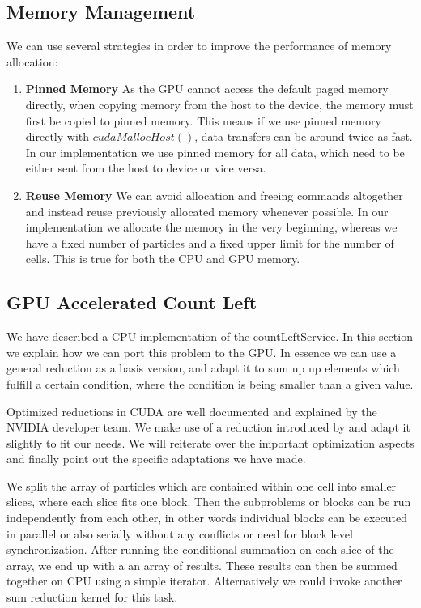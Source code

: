 \documentclass[]{article}
\begin{document}
\subsection{Memory Management}

We can use several strategies in order to improve the performance of memory allocation: 

\begin{enumerate}
	\item \textbf{Pinned Memory} As the GPU cannot access the default paged memory directly, when copying memory from the host to the device, the memory must first be copied to pinned memory. This means if we use pinned memory directly with $cudaMallocHost()$, data transfers can be around twice as fast. In our implementation we use pinned memory for all data, which need to be either sent from the host to device or vice versa.
	\item \textbf{Reuse Memory} We can avoid allocation and freeing commands altogether and instead reuse previously allocated memory whenever possible. In our implementation we allocate the memory in the very beginning, whereas we have a fixed number of particles and a fixed upper limit for the number of cells. This is true for both the CPU and GPU memory.
\end{enumerate}

\subsection{GPU Accelerated Count Left}


We have described a CPU implementation of the countLeftService. In this section we explain how we can port this problem to the GPU. In essence we can use a general reduction as a basis version, and adapt it to sum up up elements which fulfill a certain condition, where the condition is being smaller than a given value.

Optimized reductions in CUDA are well documented and explained by the NVIDIA developer team. We make use of a reduction introduced by  and adapt it slightly to fit our needs. We will reiterate over the important optimization aspects and finally point out the specific adaptations we have made. 

We split the array of particles which are contained within one cell into smaller slices, where each slice fits one block. Then the subproblems or blocks can be run independently from each other, in other words individual blocks can be executed in parallel or also serially without any conflicts or need for block level synchronization. After running the conditional summation on each slice of the array, we end up with a an array of results. These results can then be summed together on CPU using a simple iterator. Alternatively we could invoke another sum reduction kernel for this task.
\end{document}
